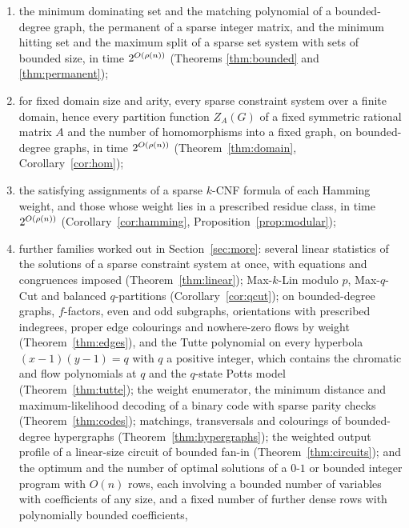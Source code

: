 \begin{enumerate}[label=(\roman*),leftmargin=2.2em]
Ising model with integer couplings and fields, and of the $q$-state Potts model,
on graphs of maximum degree $\Delta$ with $n$ vertices, in time
$2^{O_{\Delta,q}(\rhon(n))}$ (Theorem~\ref{thm:ising}); every partition function
and every ground state follows;
\item\label{it:bounded} the minimum dominating set and the matching polynomial of
a bounded-degree graph, the permanent of a sparse integer matrix, and the
minimum hitting set and the maximum split of a sparse set system with sets of
bounded size, in time $2^{O(\rho(n))}$ (Theorems \ref{thm:bounded} and
\ref{thm:permanent});
\item\label{it:domain} for fixed domain size and arity, every sparse constraint
system over a finite domain, hence every partition function $Z_A(G)$ of a
fixed symmetric rational matrix $A$ and the number of homomorphisms into a
fixed graph, on bounded-degree graphs, in time $2^{O(\rho(n))}$
(Theorem~\ref{thm:domain}, Corollary~\ref{cor:hom});
\item\label{it:global} the satisfying assignments of a sparse $k$-CNF formula
of each Hamming weight, and those whose weight lies in a prescribed residue
class, in time $2^{O(\rho(n))}$ (Corollary~\ref{cor:hamming},
Proposition~\ref{prop:modular});
\item\label{it:more} further families worked out in Section~\ref{sec:more}:
several linear statistics of the solutions of a sparse constraint system at
once, with equations and congruences imposed (Theorem~\ref{thm:linear});
Max-$k$-Lin modulo $p$, Max-$q$-Cut and balanced $q$-partitions
(Corollary~\ref{cor:qcut}); on bounded-degree graphs, $f$-factors, even and
odd subgraphs, orientations with prescribed indegrees, proper edge colourings
and nowhere-zero flows by weight (Theorem~\ref{thm:edges}), and the Tutte
polynomial on every hyperbola $(x-1)(y-1)=q$ with $q$ a positive integer,
which contains the chromatic and flow polynomials at $q$ and the $q$-state
Potts model (Theorem~\ref{thm:tutte}); the weight enumerator, the minimum
distance and maximum-likelihood decoding of a binary code with sparse parity
checks (Theorem~\ref{thm:codes}); matchings, transversals and colourings of
bounded-degree hypergraphs (Theorem~\ref{thm:hypergraphs}); the weighted
output profile of a linear-size circuit of bounded fan-in
(Theorem~\ref{thm:circuits}); and the optimum and the number of optimal
solutions of a $0$-$1$ or bounded integer program with $O(n)$ rows, each
involving a bounded number of variables with coefficients of any size, and a
fixed number of further dense rows with polynomially bounded coefficients,

\end{enumerate}
